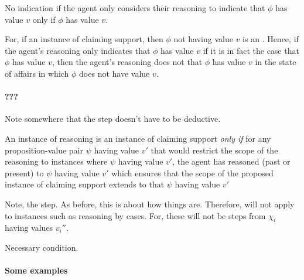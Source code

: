\begin{note}
  \begin{proposition}
    No indication if the agent only considers their reasoning to indicate that \(\phi\) has value \(v\) only if \(\phi\) has value \(v\).
  \end{proposition}

  For, if an instance of claiming support, then \(\phi\) not having value \(v\) is an \epAdv{}.
  Hence, if the agent's reasoning only indicates that \(\phi\) has value \(v\) if it is in fact the case that \(\phi\) has value \(v\), then the agent's reasoning does not  that \(\phi\) has value \(v\) in the \epAdv{} state of affairs in which \(\phi\) does not have value \(v\).
\end{note}


\paragraph{???}

\begin{note}
  \color{red}
  Note somewhere that the step doesn't have to be deductive.
\end{note}


\begin{note}
  An instance of reasoning is an instance of claiming support \emph{only if} for any proposition-value pair \(\psi\) having value \(v'\) that would restrict the scope of the reasoning to instances where \(\psi\) having value \(v'\), the agent has reasoned (past or present) to \(\psi\) having value \(v'\) which ensures that the scope of the proposed instance of claiming support extends to \ep{} that \(\psi\) having value \(v'\)
\end{note}

\begin{note}
  \color{red}
  Note, the step.
  As before, this is about how things are.
  Therefore, will not apply to instances such as reasoning by cases.
  For, these will not be steps from \(\chi_{i}\) having values \(v_{i}''\).

  Necessary condition.
\end{note}

\paragraph{Some examples}



